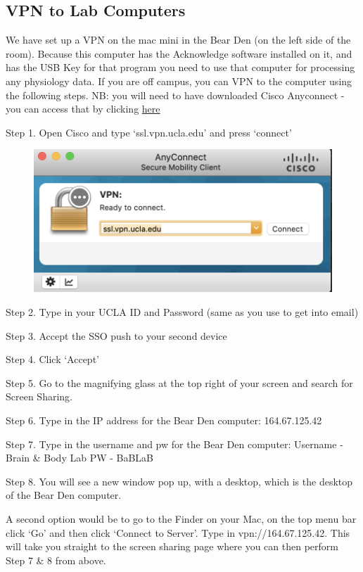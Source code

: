 \documentclass[]{book}
\begin{document}
\subsection{VPN to Lab Computers}\label{vpn-to-lab-computers}

We have set up a VPN on the mac mini in the Bear Den (on the left side
of the room). Because this computer has the Acknowledge software
installed on it, and has the USB Key for that program you need to use
that computer for processing any physiology data. If you are off campus,
you can VPN to the computer using the following steps. NB: you will need
to have downloaded Cisco Anyconnect - you can access that by clicking
\href{https://www.it.ucla.edu/it-support-center/services/virtual-private-network-vpn-clients}{here}

Step 1. Open Cisco and type `ssl.vpn.ucla.edu' and press `connect'

\begin{figure}
\centering
\includegraphics{images/lab_protocols/cisco/1.png}
\caption{}
\end{figure}

Step 2. Type in your UCLA ID and Password (same as you use to get into
email)

Step 3. Accept the SSO push to your second device

Step 4. Click `Accept'

Step 5. Go to the magnifying glass at the top right of your screen and
search for Screen Sharing.

Step 6. Type in the IP address for the Bear Den computer: 164.67.125.42

Step 7. Type in the username and pw for the Bear Den computer: Username
- Brain \& Body Lab PW - BaBLaB

Step 8. You will see a new window pop up, with a desktop, which is the
desktop of the Bear Den computer.

A second option would be to go to the Finder on your Mac, on the top
menu bar click `Go' and then click `Connect to Server'. Type in
vpn://164.67.125.42. This will take you straight to the screen sharing
page where you can then perform Step 7 \& 8 from above.
\end{document}
